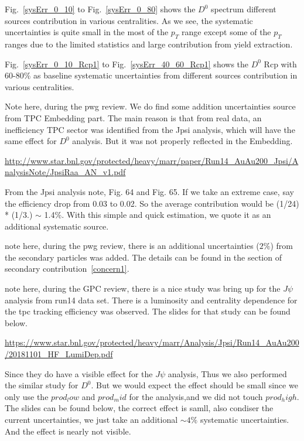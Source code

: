 Fig.~\ref{sysErr_0_10} to Fig.~\ref{sysErr_0_80} shows the $D^0$ spectrum different sources contribution in various centralities. As we see, the systematic uncertainties is quite small in the most of the $p_T$ range except some of the $p_T$ ranges due to the limited statistics and large contribution from yield extraction.

Fig.~\ref{sysErr_0_10_Rcp1} to Fig.~\ref{sysErr_40_60_Rcp1} shows the $D^0$ Rcp with 60-80\% as baseline systematic uncertainties from different sources contribution in various centralities. 

Note here, during the pwg review. We do find some addition uncertainties source from TPC Embedding part. The main reason is that from real data, an inefficiency TPC sector was identified from the Jpsi analysis, which will have the same effect for $D^0$ analysis. But it was not properly reflected in the Embedding. 

\url{http://www.star.bnl.gov/protected/heavy/marr/paper/Run14_AuAu200_Jpsi/AnalysisNote/JpsiRaa_AN_v1.pdf}

From the Jpsi analysis note, Fig. 64 and Fig. 65. If we take an extreme case, say the efficiency drop from 0.03 to 0.02. So the average contribution would be (1/24) * (1/3.) $\sim$ 1.4\%. With this simple and quick estimation, we quote it as an additional systematic source.

note here, during the pwg review, there is an additional uncertainties ($2\%$) from the secondary particles was added. The details can be found in the section of secondary contribution~\ref{concern1}.

note here, during the GPC review, there is a nice study was bring up for the $J\psi$ analysis from run14 data set. There is a luminosity and centrality dependence for the tpc tracking efficiency was observed. The slides for that study can be found below. 

\url{https://www.star.bnl.gov/protected/heavy/marr/Analysis/Jpsi/Run14_AuAu200/20181101_HF_LumiDep.pdf}

Since they do have a visible effect for the $J\psi$ analysis, Thus we also performed the similar study for $D^0$. But we would expect the effect should be small since we only use the $prod_low$ and $prod_mid$ for the analysis,and we did not touch $prod_high$. The slides can be found below, the correct effect is samll, also condiser the current uncertainties, we just take an additional $\sim4\%$ systematic uncertainties. And the effect is nearly not visible.

